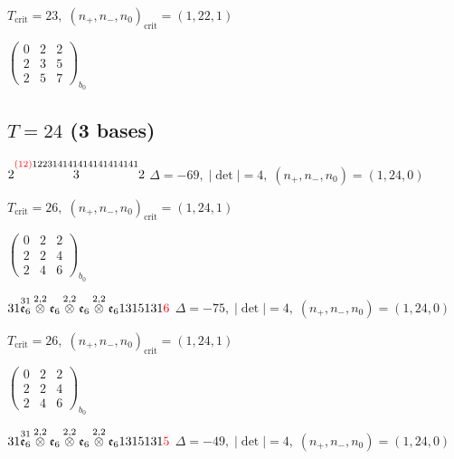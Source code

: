 \documentclass[10pt]{article}
\begin{document}
\hspace{1em}$T_{\text{crit}}=23,\; (n_+,n_-,n_0)_{\text{crit}}=(1,22,1)$

\hspace{2em}$\left(\begin{smallmatrix}0 & 2 & 2 \\ 2 & 3 & 5 \\ 2 & 5 & 7\end{smallmatrix}\right)_{\!b_0}$


\subsection*{$T = 24$ \quad (3 bases)}
\smallskip

$2\overset{\textcolor{red}{(12)}122314141414141414141}{3}2$ \quad $\Delta=-69,\; |\det|=4,\; (n_+,n_-,n_0)=(1,24,0)$

\hspace{1em}$T_{\text{crit}}=26,\; (n_+,n_-,n_0)_{\text{crit}}=(1,24,1)$

\hspace{2em}$\left(\begin{smallmatrix}0 & 2 & 2 \\ 2 & 2 & 4 \\ 2 & 4 & 6\end{smallmatrix}\right)_{\!b_0}$

\smallskip

$31\overset{31}{\mathfrak{e}_6}\overset{2,2}{\otimes}\mathfrak{e}_6\overset{2,2}{\otimes}\mathfrak{e}_6\overset{2,2}{\otimes}\mathfrak{e}_61315131\textcolor{red}{6}$ \quad $\Delta=-75,\; |\det|=4,\; (n_+,n_-,n_0)=(1,24,0)$

\hspace{1em}$T_{\text{crit}}=26,\; (n_+,n_-,n_0)_{\text{crit}}=(1,24,1)$

\hspace{2em}$\left(\begin{smallmatrix}0 & 2 & 2 \\ 2 & 2 & 4 \\ 2 & 4 & 6\end{smallmatrix}\right)_{\!b_0}$

$31\overset{31}{\mathfrak{e}_6}\overset{2,2}{\otimes}\mathfrak{e}_6\overset{2,2}{\otimes}\mathfrak{e}_6\overset{2,2}{\otimes}\mathfrak{e}_61315131\textcolor{red}{5}$ \quad $\Delta=-49,\; |\det|=4,\; (n_+,n_-,n_0)=(1,24,0)$
\end{document}
